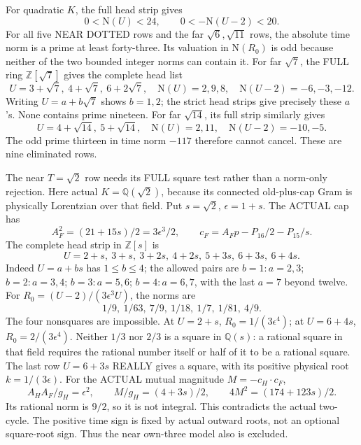 For quadratic \(K\), the full head strip gives
\[
                     0<\mathrm N(U)<24,\qquad
                     0<-\mathrm N(U-2)<20.
\]
For all five NEAR DOTTED rows and the far
\(\sqrt6,\sqrt{11}\) rows, the absolute time
norm is a prime at least forty-three.
Its valuation in \(\mathrm N(R_0)\) is odd
because neither of the two bounded integer norms
can contain it.
For far \(\sqrt7\), the FULL ring
\(\mathbb Z[\sqrt7]\) gives the complete head list
\[
 U=3+\sqrt7,\ 4+\sqrt7,\ 6+2\sqrt7,
\quad \mathrm N(U)=2,9,8,\quad
 \mathrm N(U-2)=-6,-3,-12 .
\]
Writing \(U=a+b\sqrt7\) shows \(b=1,2\);
the strict head strips give precisely these \(a\)'s.
None contains prime nineteen.
For far \(\sqrt{14}\), its full strip similarly
gives
\[
 U=4+\sqrt{14},\ 5+\sqrt{14},\quad
 \mathrm N(U)=2,11,\quad\mathrm N(U-2)=-10,-5 .
\]
The odd prime thirteen in time norm \(-117\)
therefore cannot cancel.
These are nine eliminated rows.

The near \(T=\sqrt2\) row needs its FULL square
test rather than a norm-only rejection.
Here actual \(K=\mathbb Q(\sqrt2)\), because its
connected old-plus-cap Gram is physically Lorentzian
over that field.
Put \(s=\sqrt2\), \(\epsilon=1+s\).
The ACTUAL cap has
\[
 A_F^2=(21+15s)/2=3\epsilon^3/2,\qquad
 c_F=A_Fp-P_{16}/2-P_{15}/s .
\]
The complete head strip in \(\mathbb Z[s]\) is
\[
         U=2+s,\ 3+s,\ 3+2s,\ 4+2s,\ 5+3s,\ 6+3s,\ 6+4s .
\]
Indeed \(U=a+bs\) has \(1\le b\le4\);
the allowed pairs are
\(b=1:a=2,3\);
\(b=2:a=3,4\);
\(b=3:a=5,6\);
\(b=4:a=6,7\), with the last \(a=7\) beyond twelve.
For \(R_0=(U-2)/(3\epsilon^3U)\), the norms are
\[
                      1/9,\ 1/63,\ 7/9,\ 1/18,\ 1/7,\ 1/81,\ 4/9 .
\]
The four nonsquares are impossible.
At \(U=2+s\), \(R_0=1/(3\epsilon^4)\);
at \(U=6+4s\), \(R_0=2/(3\epsilon^4)\).
Neither \(1/3\) nor \(2/3\) is a square in
\(\mathbb Q(s)\): a rational square in that field
requires the rational number itself or half of
it to be a rational square.
The last row \(U=6+3s\) REALLY gives a square,
with its positive physical root \(k=1/(3\epsilon)\).
For the ACTUAL mutual magnitude \(M=-c_H\cdot c_F\),
\[
 A_HA_F/g_H=\epsilon^2,\qquad
 M/g_H=(4+3s)/2,\qquad
                    4M^2=(174+123s)/2 .
\]
Its rational norm is \(9/2\), so it is not integral.
This contradicts the actual two-cycle.
The positive time sign is fixed by actual outward
roots, not an optional square-root sign.
Thus the near own-three model also is excluded.

